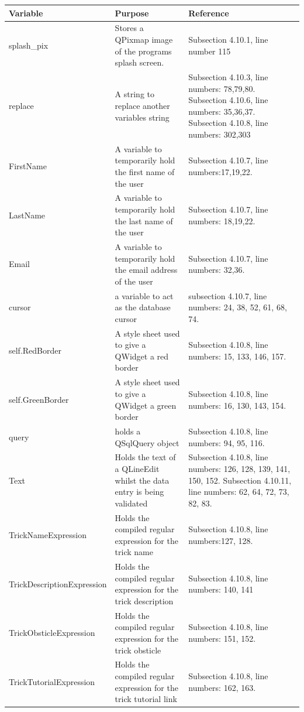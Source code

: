 \begin{center}
\begin{longtable}{|p{5cm}|p{6cm}|p{3.5cm}|} \hline
\textbf{Variable} & \textbf{Purpose} & \textbf{Reference} \\ \hline
splash\_pix & Stores a QPixmap image of the programs splash screen. & Subsection 4.10.1, line number 115 \\ \hline
replace & A string to replace another variables string & Subsection 4.10.3, line numbers: 78,79,80. Subsection 4.10.6, line numbers: 35,36,37. Subsection 4.10.8, line numbers: 302,303 \\ \hline
FirstName & A variable to temporarily hold the first name of the user & Subsection 4.10.7, line numbers:17,19,22. \\ \hline
LastName & A variable to temporarily hold the last name of the user & Subsection 4.10.7, line numbers: 18,19,22. \\ \hline
Email & A variable to temporarily hold the email address of the user & Subsection 4.10.7, line numbers: 32,36. \\ \hline
cursor & a variable to act as the database cursor & subsection 4.10.7, line numbers: 24, 38, 52, 61, 68, 74. \\ \hline
self.RedBorder & A style sheet used to give a QWidget a red border & Subsection 4.10.8, line numbers: 15, 133, 146, 157. \\ \hline
self.GreenBorder & A style sheet used to give a QWidget a green border & Subsection 4.10.8, line numbers: 16, 130, 143, 154. \\ \hline
query & holds a QSqlQuery object & Subsection 4.10.8, line numbers: 94, 95, 116. \\ \hline
Text & Holds the text of a QLineEdit whilst the data entry is being validated &Subsection 4.10.8, line numbers: 126, 128, 139, 141, 150, 152. Subsection 4.10.11, line numbers: 62, 64, 72, 73, 82, 83. \\ \hline
TrickNameExpression & Holds the compiled regular expression for the trick name & Subsection 4.10.8, line numbers:127, 128. \\ \hline
TrickDescriptionExpression & Holds the compiled regular expression for the trick description & Subsection 4.10.8, line numbers: 140, 141 \\ \hline
TrickObsticleExpression & Holds the compiled regular expression for the trick obsticle &Subsection 4.10.8, line numbers: 151, 152. \\ \hline
TrickTutorialExpression & Holds the compiled regular expression for the trick tutorial link & Subsection 4.10.8, line numbers: 162, 163. \\ \hline

\end{longtable}
\end{center}
